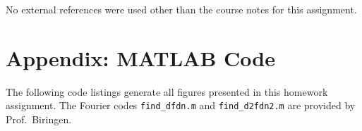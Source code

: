 \documentclass[11pt]{article}
\begin{document}
No external references were used other than the course notes for this assignment.

\section*{Appendix: MATLAB Code} %

The following code listings generate all figures presented in this homework assignment. The Fourier codes \lstinline|find_dfdn.m| and \lstinline|find_d2fdn2.m| are provided by Prof.\ Biringen.


\end{document}
